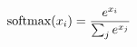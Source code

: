 \documentclass[preview]{standalone}
\begin{document}
\begin{align*}
\special{dvisvgm:raw <g id='unique000'>}\text{softmax}(x_i) = \frac{e^{x_i}}{\sum_{j} e^{x_j}}\special{dvisvgm:raw </g>}
\end{align*}
\end{document}
